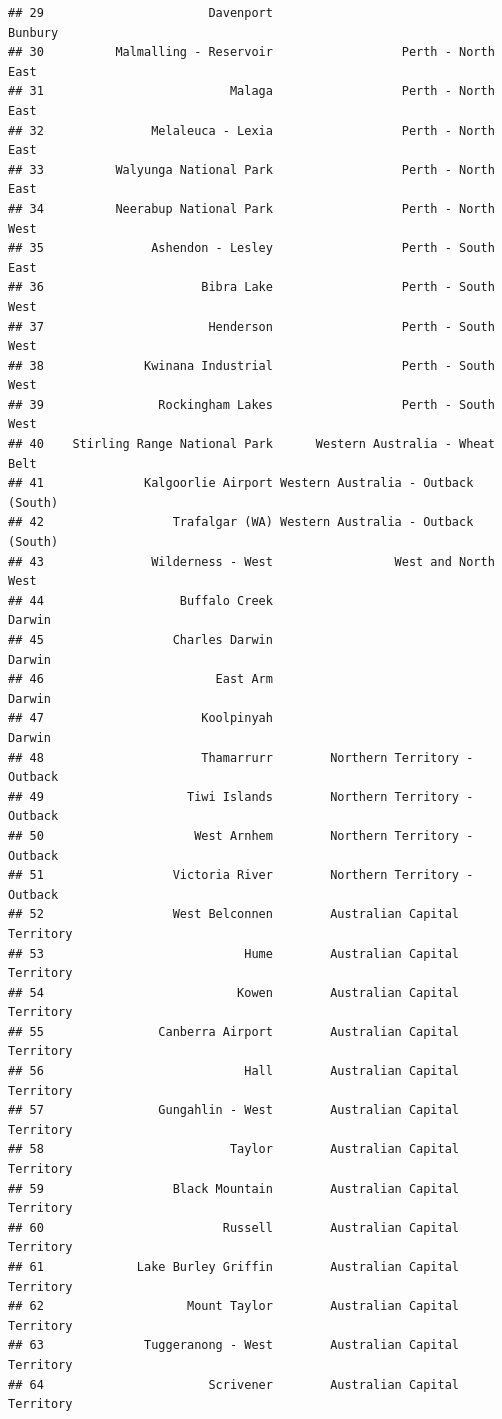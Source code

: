 \documentclass[]{article}
\begin{document}
\begin{verbatim}
## 29                       Davenport                             Bunbury
## 30          Malmalling - Reservoir                  Perth - North East
## 31                          Malaga                  Perth - North East
## 32               Melaleuca - Lexia                  Perth - North East
## 33          Walyunga National Park                  Perth - North East
## 34          Neerabup National Park                  Perth - North West
## 35               Ashendon - Lesley                  Perth - South East
## 36                      Bibra Lake                  Perth - South West
## 37                       Henderson                  Perth - South West
## 38              Kwinana Industrial                  Perth - South West
## 39                Rockingham Lakes                  Perth - South West
## 40    Stirling Range National Park      Western Australia - Wheat Belt
## 41              Kalgoorlie Airport Western Australia - Outback (South)
## 42                  Trafalgar (WA) Western Australia - Outback (South)
## 43               Wilderness - West                 West and North West
## 44                   Buffalo Creek                              Darwin
## 45                  Charles Darwin                              Darwin
## 46                        East Arm                              Darwin
## 47                      Koolpinyah                              Darwin
## 48                      Thamarrurr        Northern Territory - Outback
## 49                    Tiwi Islands        Northern Territory - Outback
## 50                     West Arnhem        Northern Territory - Outback
## 51                  Victoria River        Northern Territory - Outback
## 52                  West Belconnen        Australian Capital Territory
## 53                            Hume        Australian Capital Territory
## 54                           Kowen        Australian Capital Territory
## 55                Canberra Airport        Australian Capital Territory
## 56                            Hall        Australian Capital Territory
## 57                Gungahlin - West        Australian Capital Territory
## 58                          Taylor        Australian Capital Territory
## 59                  Black Mountain        Australian Capital Territory
## 60                         Russell        Australian Capital Territory
## 61             Lake Burley Griffin        Australian Capital Territory
## 62                    Mount Taylor        Australian Capital Territory
## 63              Tuggeranong - West        Australian Capital Territory
## 64                       Scrivener        Australian Capital Territory

\end{verbatim}
\end{document}
